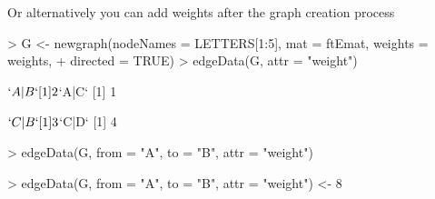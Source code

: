 \documentclass[12pt,oneside,titlepage,letter]{article}
\begin{document}
Or alternatively you can add weights after the graph creation process
\begin{Schunk}
\begin{Sinput}
> G <- newgraph(nodeNames = LETTERS[1:5], mat = ftEmat, weights = weights, 
+     directed = TRUE)
> edgeData(G, attr = "weight")
\end{Sinput}
\begin{Soutput}
$`A|B`
[1] 2

$`A|C`
[1] 1

$`C|B`
[1] 3

$`C|D`
[1] 4
\end{Soutput}
\begin{Sinput}
> edgeData(G, from = "A", to = "B", attr = "weight")
\end{Sinput}
\begin{Sinput}
> edgeData(G, from = "A", to = "B", attr = "weight") <- 8
\end{Sinput}
\end{Schunk}
\end{document}

